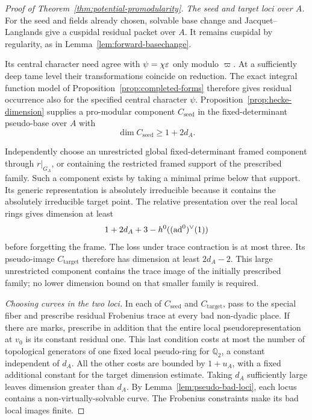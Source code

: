 \begin{proof}[Proof of Theorem~\ref{thm:potential-promodularity}]
\emph{The seed and target loci over \(A\).}
For the seed and fields already chosen, solvable base change and Jacquet--Langlands
give a cuspidal residual packet over \(A\).
It remains cuspidal by regularity, as in
Lemma~\ref{lem:forward-basechange}.

Its central character need agree with
\(\psi=\chi\varepsilon\) only modulo \(\varpi\).
At a sufficiently deep tame level their
transformations coincide on reduction.
The exact integral function model of
Proposition~\ref{prop:completed-forms} therefore
gives residual occurrence also for the
specified central character \(\psi\).
Proposition~\ref{prop:hecke-dimension} supplies
a pro-modular component \(C_{\mathrm{seed}}\)
in the fixed-determinant pseudo-base over \(A\)
with
\[
 \dim C_{\mathrm{seed}}\ge1+2d_A.
\]

Independently choose an unrestricted global
fixed-determinant framed component through
\(r|_{G_A}\), or containing the restricted
framed support of the prescribed family.
Such a component exists by taking a minimal
prime below that support. Its generic
representation is absolutely irreducible
because it contains the absolutely irreducible
target point.
The relative presentation over the real
local rings gives dimension at least
\[
 1+2d_A+3-h^0((\operatorname{ad}^0)^\vee(1))
\]
before forgetting the frame. The loss under
trace contraction is at most three.
Its pseudo-image \(C_{\mathrm{target}}\)
therefore has dimension at least
\(2d_A-2\). This large unrestricted component
contains the trace image of the initially
prescribed family; no lower dimension
bound on that smaller family is required.

\smallskip
\noindent\emph{Choosing curves in the two loci.}
In each of \(C_{\mathrm{seed}}\) and
\(C_{\mathrm{target}}\), pass to the special
fiber and prescribe residual Frobenius trace
at every bad non-dyadic place. If there are
marks, prescribe in addition that the
entire local pseudorepresentation at
\(v_0\) is its constant residual one.
This last condition costs at most the
number of topological generators of one
fixed local pseudo-ring for \(\mathbb Q_2\),
a constant independent of \(d_A\).
All the other costs are bounded by
\(1+u_A\), with a fixed additional constant
for the target dimension estimate.
Taking \(d_A\) sufficiently large leaves
dimension greater than \(d_A\).
By Lemma~\ref{lem:pseudo-bad-loci}, each locus
contains a non-virtually-solvable curve.
The Frobenius constraints make its bad
local images finite.


\end{proof}
